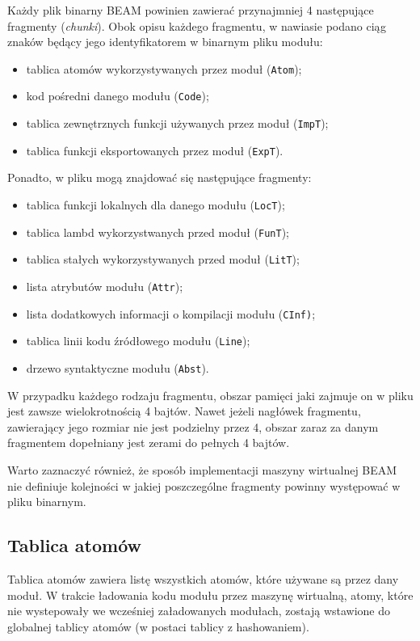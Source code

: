 Każdy plik binarny BEAM powinien zawierać przynajmniej 4 następujące fragmenty (\emph{chunki}).
Obok opisu każdego fragmentu, w nawiasie podano ciąg znaków będący jego identyfikatorem w binarnym pliku modułu:
\begin{itemize}
\item tablica atomów wykorzystywanych przez moduł (\texttt{Atom});
\item kod pośredni danego modułu (\texttt{Code});
\item tablica zewnętrznych funkcji używanych przez moduł (\texttt{ImpT});
\item tablica funkcji eksportowanych przez moduł (\texttt{ExpT}).
\end{itemize}

Ponadto, w pliku mogą znajdować się następujące fragmenty:
\begin{itemize}
\item tablica funkcji lokalnych dla danego modułu (\texttt{LocT});
\item tablica lambd wykorzystwanych przed moduł (\texttt{FunT});
\item tablica stałych wykorzystywanych przed moduł (\texttt{LitT});
\item lista atrybutów modułu (\texttt{Attr});
\item lista dodatkowych informacji o kompilacji modułu (\texttt{CInf)};
\item tablica linii kodu źródłowego modułu (\texttt{Line});
\item drzewo syntaktyczne modułu (\texttt{Abst}).
\end{itemize}

W przypadku każdego rodzaju fragmentu, obszar pamięci jaki zajmuje on w pliku jest zawsze wielokrotnością 4 bajtów. Nawet jeżeli nagłówek fragmentu, zawierający jego rozmiar nie jest podzielny przez 4, obszar zaraz za danym fragmentem dopełniany jest zerami do pełnych 4 bajtów.

Warto zaznaczyć również, że sposób implementacji maszyny wirtualnej BEAM nie definiuje kolejności w jakiej poszczególne fragmenty powinny występować w pliku binarnym.

\subsection{Tablica atomów}
Tablica atomów zawiera listę wszystkich atomów, które używane są przez dany moduł. W trakcie ładowania kodu modułu przez maszynę wirtualną, atomy, które nie wystepowały we wcześniej załadowanych modułach, zostają wstawione do globalnej tablicy atomów (w postaci tablicy z hashowaniem).


